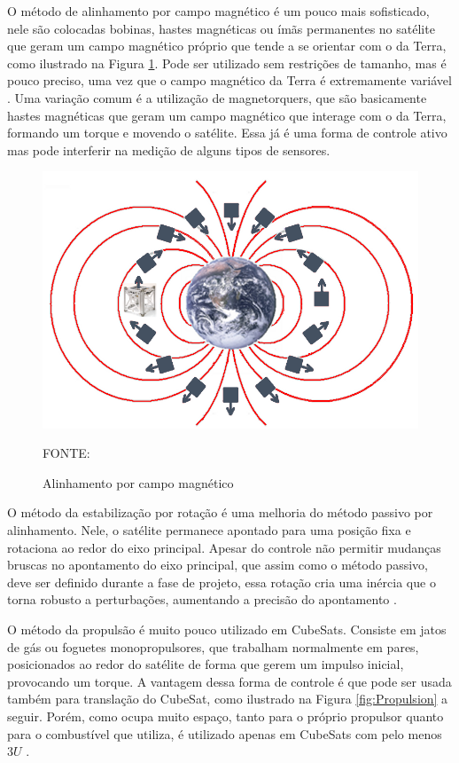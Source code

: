 \documentclass[
	12pt,				%
	openany,			%
	twoside,			%
	a4paper,			%
	english,			%
	french,				%
	spanish,			%
	brazil,				%
	oldfontcommands
	]{abntex2}
\begin{document}
O método de alinhamento por campo magnético é um pouco mais sofisticado, nele são colocadas bobinas, hastes magnéticas ou ímãs permanentes no satélite que geram um campo magnético próprio que tende a se orientar com o da Terra, como ilustrado na Figura \ref{fig:Mag_Field}. Pode ser utilizado sem restrições de tamanho, mas é pouco preciso, uma vez que o campo magnético da Terra é extremamente variável \cite{FrancLav}. Uma variação comum é a utilização de magnetorquers, que são basicamente hastes magnéticas que geram um campo magnético que interage com o da Terra, formando um torque e movendo o satélite. Essa já é uma forma de controle ativo mas pode interferir na medição de alguns tipos de sensores.

\begin{figure}[th]
	\caption{Alinhamento por campo magnético}
	\centering
	\includegraphics[width=0.8\linewidth]{./figs/Mag_Field}
	
	\begin{small}
		FONTE: \cite{FrancLav}
	\end{small}
	\label{fig:Mag_Field}
\end{figure}

\newpage

O método da estabilização por rotação é uma melhoria do método passivo por alinhamento. Nele, o satélite permanece apontado para uma posição fixa e rotaciona ao redor do eixo principal. Apesar do controle não permitir mudanças bruscas no apontamento do eixo principal, que assim como o método passivo, deve ser definido durante a fase de projeto, essa rotação cria uma inércia que o torna robusto a perturbações, aumentando a precisão do apontamento \cite{FrancLav}.

O método da propulsão é muito pouco utilizado em CubeSats. Consiste em jatos de gás ou foguetes monopropulsores, que trabalham normalmente em pares, posicionados ao redor do satélite de forma que gerem um impulso inicial, provocando um torque. A vantagem dessa forma de controle é que pode ser usada também para translação do CubeSat, como ilustrado na Figura \ref{fig:Propulsion} a seguir. Porém, como ocupa muito espaço, tanto para o próprio propulsor quanto para o combustível que utiliza, é utilizado apenas em CubeSats com pelo menos $3U$ \cite{Luka}.
\end{document}
